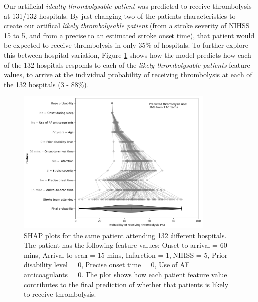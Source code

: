 Our artificial \emph{ideally thrombolysable patient} was predicted to receive thrombolysis at 131/132 hospitals. By just changing two of the patients characteristics to create our artifical \emph{likely thrombolysable patient} (from a stroke severity of NIHSS 15 to 5, and from a precise to an estimated stroke onset time), that patient would be expected to receive thrombolysis in only 35\% of hospitals. To further explore this between hospital variation, Figure \ref{fig:results_artifical_shap_waterfall_with_violin} shows how the model predicts how each of the 132 hospitals responds to each of the \emph{likely thrombolysable patients} feature values, to arrive at the individual probability of receiving thrombolysis at each of the 132 hospitals (3 - 88\%).

\begin{figure}[!h]
\centering
\includegraphics[width=0.85\textwidth]{./images/21_shap_waterfall_with_violin_no_benchmark}
\caption{SHAP plots for the same patient attending 132 different hospitals. The patient has the following feature values: Onset to arrival = 60 mins, Arrival to scan = 15 mins, Infarction = 1, NIHSS = 5, Prior disability level = 0, Precise onset time = 0, Use of AF anticoagulants = 0. The plot shows how each patient feature value contributes to the final prediction of whether that patients is likely to receive thrombolysis.}
\label{fig:results_artifical_shap_waterfall_with_violin}
\end{figure}








